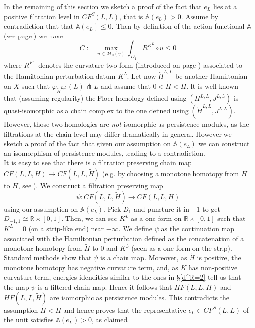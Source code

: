 	In the remaining of this section we sketch a proof of the fact that $e_L$ lies at a positive filtration level in $CF^S(L,L)$, that is $\mathbb{A}(e_L)>0$. Assume by contradiction that that $\mathbb{A}(e_L)\leq 0$. Then by definition of the action functional $\mathbb A$ (see page \pageref{actionfunctionaldefinition}) we have $$C:=\max_{u\in \mathcal{M}_0(\gamma)}\int_{D_1}R^{K^L}\circ u\leq 0$$ where $R^{K^L}$ denotes the curvature two form (introduced on page \pageref{curvatureform}) associated to the Hamiltonian perturbation datum $K^L$.
	Let now $\tilde{H}^{L,L}$ be another Hamiltonian on $X$ such that $\varphi_{\tilde{H}^{L,L}}(L)\pitchfork L$ and assume that $0<\tilde{H}<H$. It is well known that (assuming regularity) the Floer homology defined using $(H^{L,L},J^{L,L})$ is quasi-isomorphic as a chain complex to the one defined using $(\tilde{H}^{L,L},J^{L,L})$. However, those two homologies are \textit{not} isomorphic as persistence modules, as the filtrations at the chain level may differ dramatically in general. However we sketch a proof of the fact that given our assumption on $\mathbb{A}(e_L)$ we can construct an isomorphism of persistence modules, leading to a contradiction. \\
	It is easy to see that there is a filtration preserving chain map $CF(L,L,H)\to CF(L,L,\tilde{H})$ (e.g. by choosing a monotone homotopy from $H$ to $\tilde{H}$, see \cite{Bi-Po-Sa:Propagation}). We construct a filtration preserving map $$\psi: CF(L,L,\tilde{H})\to CF(L,L,H)$$ using our assumption on $\mathbb{A}(e_L)$. Pick $D_1$ and puncture it in $-1$ to get $D_{-1,1}\cong \mathbb{R}\times [0,1]$. Then, we can see $K^L$ as a one-form on $\mathbb{R}\times [0,1]$ such that $K^L=0$ (on a strip-like end) near $-\infty$. We define $\psi$ as the continuation map associated with the Hamiltonian perturbation defined as the concatenation of a monotone homotopy from $\tilde{H}$ to $0$ and $K^{L}$ (seen as a one-form on the strip). Standard methods show that $\psi$ is a chain map. Moreover, as $\tilde{H}$ is positive, the monotone homotopy has negative curvature term, and, as $K$ has non-positive curvature term, energies idendities similar to the ones in \S \ref{d^R=2} tell us that the map $\psi$ is a filtered chain map. Hence it follows that $HF(L,L,H)$ and $HF(L,L,\tilde{H})$ are isomorphic as persistence modules. This contradicts the assumption $\tilde{H}<H$ and hence proves that the representative $e_L\in CF^S(L,L)$ of the unit satisfies $\mathbb{A}(e_L)>0$, as claimed.
	
